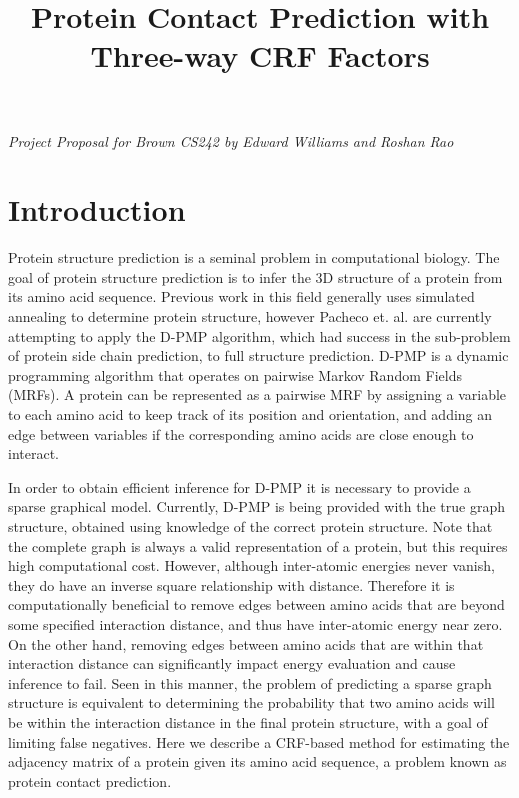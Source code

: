 \documentclass{article}
\title{Protein Contact Prediction with Three-way CRF Factors}
\begin{document}
\begin{center}
\emph{Project Proposal for Brown CS242 by Edward Williams and Roshan Rao}
\end{center}

\section{Introduction}
\vspace*{-0.1in}
Protein structure prediction is a seminal problem in computational biology. The goal of protein structure prediction is to infer the 3D structure of a protein from its amino acid sequence. Previous work in this field generally uses simulated annealing to determine protein structure, however Pacheco et. al. are currently attempting to apply the D-PMP algorithm, which had success in the sub-problem of protein side chain prediction, to full structure prediction. D-PMP is a dynamic programming algorithm that operates on pairwise Markov Random Fields (MRFs). A protein can be represented as a pairwise MRF by assigning a variable to each amino acid to keep track of its position and orientation, and adding an edge between variables if the corresponding amino acids are close enough to interact. 

In order to obtain efficient inference for D-PMP it is necessary to provide a sparse graphical model. Currently, D-PMP is being provided with the true graph structure, obtained using knowledge of the correct protein structure. Note that the complete graph is always a valid representation of a protein, but this requires high computational cost. However, although inter-atomic energies never vanish, they do have an inverse square relationship with distance. Therefore it is computationally beneficial to remove edges between amino acids that are beyond some specified interaction distance, and thus have inter-atomic energy near zero. On the other hand, removing edges between amino acids that are within that interaction distance can significantly impact energy evaluation and cause inference to fail. Seen in this manner, the problem of predicting a sparse graph structure is equivalent to determining the probability that two amino acids will be within the interaction distance in the final protein structure, with a goal of limiting false negatives. Here we describe a CRF-based method for estimating the adjacency matrix of a protein given its amino acid sequence, a problem known as protein contact prediction.
\end{document}
